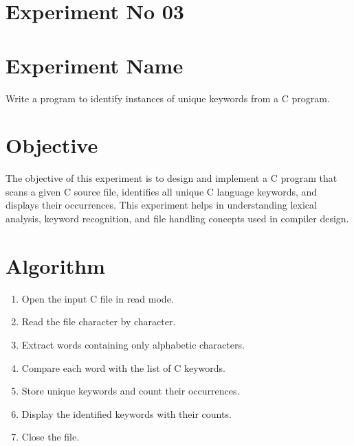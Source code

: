 \documentclass[12pt]{article}
\begin{document}
\vspace{1cm}

\section*{Experiment No 03}

\section*{Experiment Name}
Write a program to identify instances of unique keywords from a C program.

\section*{Objective}
The objective of this experiment is to design and implement a C program that scans a given C source file, identifies all unique C language keywords, and displays their occurrences. This experiment helps in understanding lexical analysis, keyword recognition, and file handling concepts used in compiler design.

\section*{Algorithm}
\begin{enumerate}
    \item Open the input C file in read mode.
    \item Read the file character by character.
    \item Extract words containing only alphabetic characters.
    \item Compare each word with the list of C keywords.
    \item Store unique keywords and count their occurrences.
    \item Display the identified keywords with their counts.
    \item Close the file.
\end{enumerate}

\newpage
\end{document}
